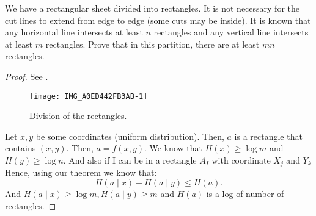 \begin{example}
	We have a rectangular sheet divided into rectangles.
	It is not necessary for the cut lines to extend from edge to edge (some cuts may be inside).
	It is known that any horizontal line intersects at least $n$ rectangles and any vertical line intersects at least $m$ rectangles.
	Prove that in this partition, there are at least  $mn$ rectangles.
 \end{example}
 \begin{proof}
	 See .
	 \begin{figure}[htpb]
	 	\centering
	 	\texttt{[image: IMG\_A0ED442FB3AB-1]}
	 	\caption{Division of the rectangles.}
	 	\label{fig:IMG_A0ED442FB3AB-1}
	 \end{figure}

	 Let $x, y$ be some coordinates (uniform distribution).
	 Then,  $a$ is a rectangle that contains $(x, y)$.
	 Then,  $a = f(x, y)$.
	 We know that  $H(x) \geq \log m$ and  $H(y) \geq \log n$.
	 And also if I can be in a rectangle  $A_I$ with coordinate $X_j$ and  $Y_k$  
	 Hence, using our theorem we know that:
	 \[
	 H(a  \mid x) + H(a  \mid y) \le  H(a)
	 .\] 
	 And $H(a  \mid x) \geq \log m, H(a  \mid y) \geq m$ and $H(a)$ is a log of number of rectangles.
 \end{proof}

